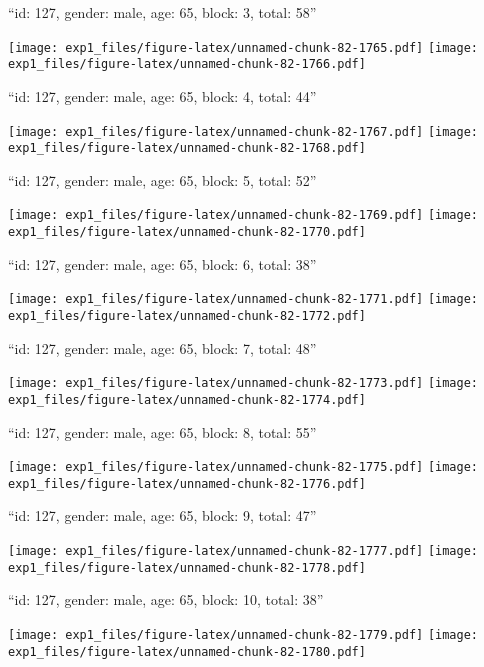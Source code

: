 \documentclass[11pt,,]{article}
\begin{document}
\newpage
[1] 

``id: 127, gender: male, age: 65, block: 3, total: 58''

\texttt{[image: exp1\_files/figure-latex/unnamed-chunk-82-1765.pdf]}
\texttt{[image: exp1\_files/figure-latex/unnamed-chunk-82-1766.pdf]}

\newpage
[1] 

``id: 127, gender: male, age: 65, block: 4, total: 44''

\texttt{[image: exp1\_files/figure-latex/unnamed-chunk-82-1767.pdf]}
\texttt{[image: exp1\_files/figure-latex/unnamed-chunk-82-1768.pdf]}

\newpage
[1] 

``id: 127, gender: male, age: 65, block: 5, total: 52''

\texttt{[image: exp1\_files/figure-latex/unnamed-chunk-82-1769.pdf]}
\texttt{[image: exp1\_files/figure-latex/unnamed-chunk-82-1770.pdf]}

\newpage
[1] 

``id: 127, gender: male, age: 65, block: 6, total: 38''

\texttt{[image: exp1\_files/figure-latex/unnamed-chunk-82-1771.pdf]}
\texttt{[image: exp1\_files/figure-latex/unnamed-chunk-82-1772.pdf]}

\newpage
[1] 

``id: 127, gender: male, age: 65, block: 7, total: 48''

\texttt{[image: exp1\_files/figure-latex/unnamed-chunk-82-1773.pdf]}
\texttt{[image: exp1\_files/figure-latex/unnamed-chunk-82-1774.pdf]}

\newpage
[1] 

``id: 127, gender: male, age: 65, block: 8, total: 55''

\texttt{[image: exp1\_files/figure-latex/unnamed-chunk-82-1775.pdf]}
\texttt{[image: exp1\_files/figure-latex/unnamed-chunk-82-1776.pdf]}

\newpage
[1] 

``id: 127, gender: male, age: 65, block: 9, total: 47''

\texttt{[image: exp1\_files/figure-latex/unnamed-chunk-82-1777.pdf]}
\texttt{[image: exp1\_files/figure-latex/unnamed-chunk-82-1778.pdf]}

\newpage
[1] 

``id: 127, gender: male, age: 65, block: 10, total: 38''

\texttt{[image: exp1\_files/figure-latex/unnamed-chunk-82-1779.pdf]}
\texttt{[image: exp1\_files/figure-latex/unnamed-chunk-82-1780.pdf]}
\end{document}

